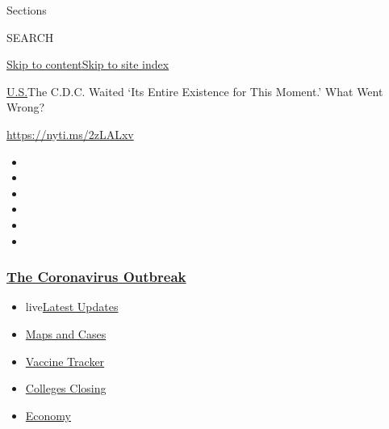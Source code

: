 Sections

SEARCH

\protect\hyperlink{site-content}{Skip to
content}\protect\hyperlink{site-index}{Skip to site index}

\href{/section/us}{U.S.}\textbar{}The C.D.C. Waited `Its Entire
Existence for This Moment.' What Went Wrong?

\url{https://nyti.ms/2zLALxv}

\begin{itemize}
\item
\item
\item
\item
\item
\item
\end{itemize}

\hypertarget{the-coronavirus-outbreak}{%
\subsubsection{\texorpdfstring{\href{https://www.nytimes3xbfgragh.onion/news-event/coronavirus?name=styln-coronavirus-national\&region=TOP_BANNER\&variant=undefined\&block=storyline_menu_recirc\&action=click\&pgtype=Article\&impression_id=9cc8e490-e37d-11ea-8f3e-bdd331327cb0}{The
Coronavirus
Outbreak}}{The Coronavirus Outbreak}}\label{the-coronavirus-outbreak}}

\begin{itemize}
\tightlist
\item
  live\href{https://www.nytimes3xbfgragh.onion/2020/08/20/world/coronavirus-covid.html?name=styln-coronavirus-national\&region=TOP_BANNER\&variant=undefined\&block=storyline_menu_recirc\&action=click\&pgtype=Article\&impression_id=9cc90ba0-e37d-11ea-8f3e-bdd331327cb0}{Latest
  Updates}
\item
  \href{https://www.nytimes3xbfgragh.onion/interactive/2020/us/coronavirus-us-cases.html?name=styln-coronavirus-national\&region=TOP_BANNER\&variant=undefined\&block=storyline_menu_recirc\&action=click\&pgtype=Article\&impression_id=9cc90ba1-e37d-11ea-8f3e-bdd331327cb0}{Maps
  and Cases}
\item
  \href{https://www.nytimes3xbfgragh.onion/interactive/2020/science/coronavirus-vaccine-tracker.html?name=styln-coronavirus-national\&region=TOP_BANNER\&variant=undefined\&block=storyline_menu_recirc\&action=click\&pgtype=Article\&impression_id=9cc90ba2-e37d-11ea-8f3e-bdd331327cb0}{Vaccine
  Tracker}
\item
  \href{https://www.nytimes3xbfgragh.onion/2020/08/19/us/colleges-closing-covid.html?name=styln-coronavirus-national\&region=TOP_BANNER\&variant=undefined\&block=storyline_menu_recirc\&action=click\&pgtype=Article\&impression_id=9cc90ba3-e37d-11ea-8f3e-bdd331327cb0}{Colleges
  Closing}
\item
  \href{https://www.nytimes3xbfgragh.onion/live/2020/08/20/business/stock-market-today-coronavirus?name=styln-coronavirus-national\&region=TOP_BANNER\&variant=undefined\&block=storyline_menu_recirc\&action=click\&pgtype=Article\&impression_id=9cc90ba4-e37d-11ea-8f3e-bdd331327cb0}{Economy}
\end{itemize}

